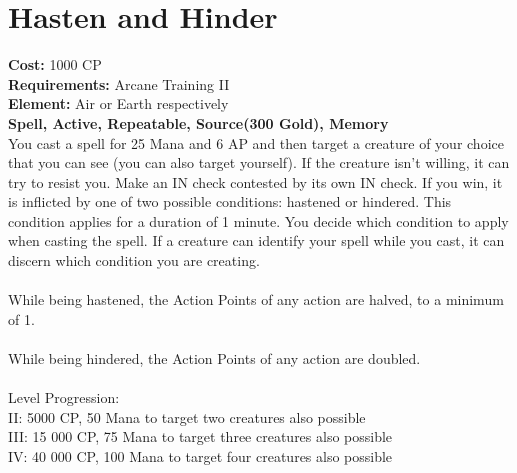 \section{Hasten and Hinder}
\textbf{Cost:} 1000 CP\\
\textbf{Requirements:} Arcane Training II\\
\textbf{Element:} Air or Earth respectively\\
\textbf{Spell, Active, Repeatable, Source(300 Gold), Memory}\\
You cast a spell for 25 Mana and 6 AP and then target a creature of your choice that you can see (you can also target yourself). If the creature isn’t willing, it can try to resist you. Make an IN check contested by its own IN check. If you win, it is inflicted by one of two possible conditions: hastened or hindered. This condition applies for a duration of 1 minute. You decide which condition to apply when casting the spell. If a creature can identify your spell while you cast, it can discern which condition you are creating.\\
\\
While being hastened, the Action Points of any action are halved, to a minimum of 1.\\
\\
While being hindered, the Action Points of any action are doubled.\\
\\
Level Progression:\\
II: 5000 CP, 50 Mana to target two creatures also possible\\
III: 15 000 CP, 75 Mana to target three creatures also possible\\
IV: 40 000 CP, 100 Mana to target four creatures also possible \\
